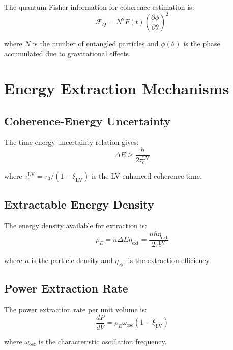 \documentclass[11pt]{article}
\begin{document}
The quantum Fisher information for coherence estimation is:
\begin{equation}
\mathcal{F}_Q = N^2 F(t) \left(\frac{\partial\phi}{\partial\theta}\right)^2
\end{equation}

where $N$ is the number of entangled particles and $\phi(\theta)$ is the phase accumulated due to gravitational effects.

\section{Energy Extraction Mechanisms}

\subsection{Coherence-Energy Uncertainty}

The time-energy uncertainty relation gives:
\begin{equation}
\Delta E \geq \frac{\hbar}{2\tau_c^{\text{LV}}}
\end{equation}

where $\tau_c^{\text{LV}} = \tau_0 / (1 - \xi_{\text{LV}})$ is the LV-enhanced coherence time.

\subsection{Extractable Energy Density}

The energy density available for extraction is:
\begin{equation}
\rho_E = n \Delta E \eta_{\text{ext}} = \frac{n\hbar\eta_{\text{ext}}}{2\tau_c^{\text{LV}}}
\end{equation}

where $n$ is the particle density and $\eta_{\text{ext}}$ is the extraction efficiency.

\subsection{Power Extraction Rate}

The power extraction rate per unit volume is:
\begin{equation}
\frac{dP}{dV} = \rho_E \omega_{\text{osc}} \left(1 + \xi_{\text{LV}}\right)
\end{equation}

where $\omega_{\text{osc}}$ is the characteristic oscillation frequency.
\end{document}
